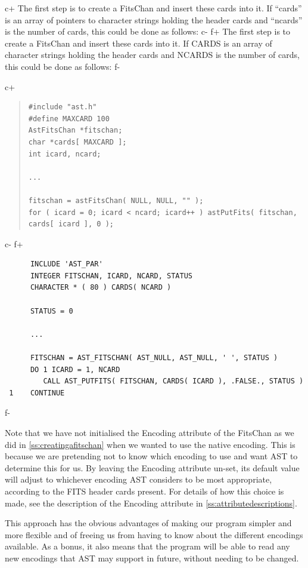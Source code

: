 \documentclass[twoside,11pt]{article}
\newcommand{\appref}[1]{Appendix~\ref{#1}}
\newcommand{\secref}[1]{\S\ref{#1}}
\renewcommand{\appref}[1]{\ref{#1}}
\renewcommand{\secref}[1]{\ref{#1}}
\begin{document}
c+
The first step is to create a FitsChan and insert these cards into
it. If ``cards'' is an array of pointers to character strings holding
the header cards and ``ncards'' is the number of cards, this could be
done as follows:
c-
f+
The first step is to create a FitsChan and insert these cards into
it. If CARDS is an array of character strings holding the header cards
and NCARDS is the number of cards, this could be done as follows:
f-

c+
\begin{quote}
\small
\begin{verbatim}
#include "ast.h"
#define MAXCARD 100
AstFitsChan *fitschan;
char *cards[ MAXCARD ];
int icard, ncard;

...

fitschan = astFitsChan( NULL, NULL, "" );
for ( icard = 0; icard < ncard; icard++ ) astPutFits( fitschan, cards[ icard ], 0 );
\end{verbatim}
\normalsize
\end{quote}
c-
f+
\small
\begin{verbatim}
      INCLUDE 'AST_PAR'
      INTEGER FITSCHAN, ICARD, NCARD, STATUS
      CHARACTER * ( 80 ) CARDS( NCARD )

      STATUS = 0

      ...

      FITSCHAN = AST_FITSCHAN( AST_NULL, AST_NULL, ' ', STATUS )
      DO 1 ICARD = 1, NCARD
         CALL AST_PUTFITS( FITSCHAN, CARDS( ICARD ), .FALSE., STATUS )
 1    CONTINUE
\end{verbatim}
\normalsize
f-

Note that we have not initialised the Encoding attribute of the
FitsChan as we did in \secref{ss:creatingafitschan} when we wanted to
use the native encoding. This is because we are pretending not to know
which encoding to use and want AST to determine this for us. By
leaving the Encoding attribute un-set, its default value will adjust
to whichever encoding AST considers to be most appropriate, according
to the FITS header cards present. For details of how this choice is
made, see the description of the Encoding attribute in
\appref{ss:attributedescriptions}.

This approach has the obvious advantages of making our program simpler
and more flexible and of freeing us from having to know about the
different encodings available. As a bonus, it also means that the
program will be able to read any new encodings that AST may support in
future, without needing to be changed.
\end{document}
